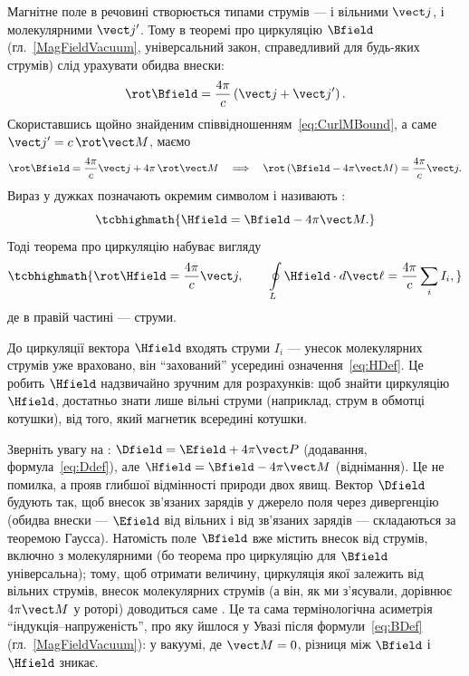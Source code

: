 Магнітне поле в речовині створюється  типами струмів --- і вільними $\vect j$, і молекулярними $\vect j'$. Тому в теоремі про
циркуляцію $\Bfield$ (гл.~\ref{MagFieldVacuum}, універсальний закон, справедливий для будь-яких струмів) слід урахувати обидва внески:
\begin{equation*}
	\rot\Bfield = \frac{4\pi}c\left(\vect j+\vect j'\right).
\end{equation*}
Скориставшись щойно знайденим співвідношенням~\eqref{eq:CurlMBound}, а саме $\vect j'=c\,\rot\Mfield$, маємо
\begin{equation*}
	\rot\Bfield = \frac{4\pi}c\vect j + 4\pi\,\rot\Mfield
	\quad\Longrightarrow\quad
	\rot\left(\Bfield - 4\pi\Mfield\right) = \frac{4\pi}c\vect j.
\end{equation*}
Вираз у дужках позначають окремим символом і називають :
\begin{equation}\label{eq:HDef}
	\tcbhighmath{
		\Hfield = \Bfield - 4\pi\Mfield.
	}
\end{equation}
Тоді теорема про циркуляцію  набуває вигляду
\begin{equation}\label{eq:CurlHFree}
	\tcbhighmath{
		\rot\Hfield = \frac{4\pi}c\vect j, \qquad \oint\limits_L \Hfield\cdot d\vect\ell = \frac{4\pi}c\sum_i I_i,
	}
\end{equation}
де в правій частині ---  струми.

\begin{Attention}
	До циркуляції вектора $\Hfield$ входять  струми $I_i$ --- унесок молекулярних струмів уже враховано, він
	\enquote{захований} усередині означення~\eqref{eq:HDef}. Це робить $\Hfield$ надзвичайно зручним для розрахунків: щоб знайти циркуляцію
	$\Hfield$, достатньо знати лише вільні струми (наприклад, струм в обмотці котушки),  від того, який магнетик всередині
	котушки.
\end{Attention}

\begin{Attention}
	Зверніть увагу на : $\Dfield=\Efield+4\pi\vect P$ (додавання, формула~\eqref{eq:Ddef}), але $\Hfield=\Bfield-4\pi\Mfield$
	(віднімання). Це не помилка, а прояв глибшої відмінності природи двох явищ. Вектор $\Dfield$ будують так, щоб  внесок
	зв'язаних зарядів у джерело поля через дивергенцію (обидва внески --- $\Efield$ від вільних і від зв'язаних зарядів --- складаються за
	теоремою Гаусса). Натомість поле $\Bfield$ вже  містить внесок від  струмів, включно з молекулярними (бо
	теорема про циркуляцію для $\Bfield$ універсальна); тому, щоб отримати величину, циркуляція якої залежить  від вільних струмів,
	внесок молекулярних струмів (а він, як ми з'ясували, дорівнює $4\pi\Mfield$ у роторі) доводиться саме . Це та сама
	термінологічна асиметрія \enquote{індукція--напруженість}, про яку йшлося у Увазі після формули~\eqref{eq:BDef} (гл.~\ref{MagFieldVacuum}): у
	вакуумі, де $\Mfield=0$, різниця між $\Bfield$ і $\Hfield$ зникає.
\end{Attention}

